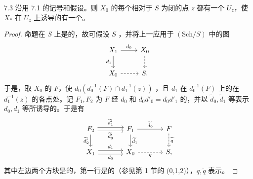 \begin{SGAresult}{}{7.3}
沿用 7.1 的记号和假设。则 $X_0$ 的每个相对于 $S$ 为闭的点 $z$ 都有一个 $U_z$，使 $X_*$ 在 $U_z$ 上诱导的有一个。
\end{SGAresult}
\begin{proof}
命题在 $S$ 上是的，故可假设 $S$ ，并将上一应用于 $(\mathrm{Sch}/S)$ 中的图
\[
\begin{tikzcd}
X_1\arrow[r,"d_0"]\arrow[d,"d_1"']&X_0\arrow[d,dashed]\\
X_0\arrow[r,dashed]&S.
\end{tikzcd}
\]
于是，取 $X_0$ 的 $F$，使 $d_0(d_0^{-1}(F)\cap d_1^{-1}(z))$ ，且 $d_1$ 在 $d_0^{-1}(F)$ 上的在 $d_1^{-1}(z)$ 的各点处。记 $F_1,F_2$ 为 $F$ 经 $d_0$ 和 $d_0d'_0=d_0d'_1$ 的，并以 $\widetilde d_0,\widetilde d_1$ 等表示 $d_0,d_1$ 等所诱导的。于是有
\[
\begin{tikzcd}[column sep=large]
F_2\arrow[r,shift left=.6ex,"\widetilde d'_1"]\arrow[r,shift right=.6ex,"\widetilde d'_0"']\arrow[d,"\widetilde d'_2"']&F_1\arrow[r,"\widetilde d_0"]\arrow[d,"\widetilde d_1"]&F\arrow[d,dashed,"\widetilde q"]\\
X_1\arrow[r,shift left=.6ex,"d_1"]\arrow[r,shift right=.6ex,"d_0"']&X_0\arrow[r,dashed,"q"']&S,
\end{tikzcd}
\]
其中左边两个方块是的，第一行是的（参见第 1 节的 (0,1,2)），$q,\widetilde q$ 表示。


\end{proof}
